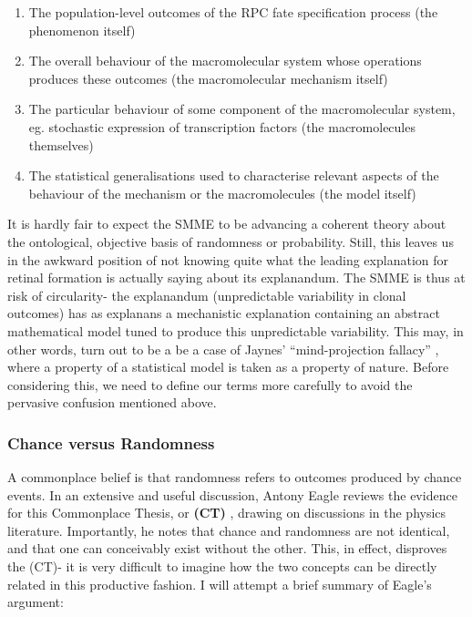\begin{enumerate}
\item The population-level outcomes of the RPC fate specification process (the phenomenon itself)
\item The overall behaviour of the macromolecular system whose operations produces these outcomes (the macromolecular mechanism itself)
\item The particular behaviour of some component of the macromolecular system, eg. stochastic expression of transcription factors (the macromolecules themselves)
\item The statistical generalisations used to characterise relevant aspects of the behaviour of the mechanism or the macromolecules (the model itself)
\end{enumerate}

It is hardly fair to expect the SMME to be advancing a coherent theory about the ontological, objective basis of randomness or probability. Still, this leaves us in the awkward position of not knowing quite what the leading explanation for retinal formation is actually saying about its explanandum. The SMME is thus at risk of circularity- the explanandum (unpredictable variability in clonal outcomes) has as explanans a mechanistic explanation containing an abstract mathematical model tuned to produce this unpredictable variability. This may, in other words, turn out to be a be a case of Jaynes' ``mind-projection fallacy'' \cite[p.506]{Jaynes2003}, where a property of a statistical model is taken as a property of nature. Before considering this, we need to define our terms more carefully to avoid the pervasive confusion mentioned above.

\subsubsection{Chance versus Randomness}
A commonplace belief is that randomness refers to outcomes produced by chance events. In an extensive and useful discussion, Antony Eagle reviews the evidence for this Commonplace Thesis, or \textbf{(CT)} \cite{Eagle2018}, drawing on discussions in the physics literature. Importantly, he notes that chance and randomness are not identical, and that one can conceivably exist without the other. This, in effect, disproves the (CT)- it is very difficult to imagine how the two concepts can be directly related in this productive fashion. I will attempt a brief summary of Eagle's argument:

